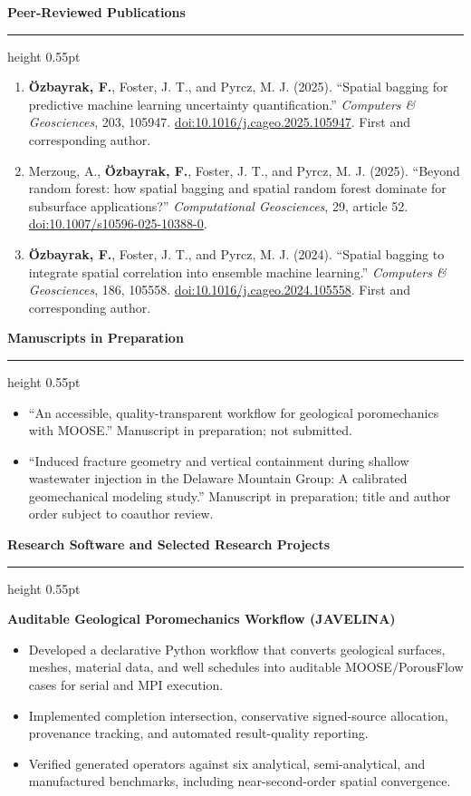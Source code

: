 \documentclass[10pt,letterpaper]{article}
\newcommand{\cvsection}[1]{%
  \needspace{4\baselineskip}%
  \vspace{5pt}%
  {\fontsize{11.5}{13.2}\selectfont\bfseries\color{accent} #1}\par
  \vspace{1.2pt}\color{accent}\hrule height 0.55pt\color{ink}\vspace{3pt}%
}
\newcommand{\cvproject}[2]{%
  \needspace{3\baselineskip}%
  {\bfseries #1}\hspace{0.35em}{\color{muted}#2}\par
  \vspace{0.5pt}%
}
\newenvironment{cvitems}{%
  \begin{itemize}[leftmargin=13pt,label=\textbullet,itemsep=1.2pt,topsep=1pt,parsep=0pt,partopsep=0pt]
}{\end{itemize}\vspace{1.5pt}}
\newenvironment{compactitems}{%
  \begin{itemize}[leftmargin=13pt,label=\textbullet,itemsep=0.8pt,topsep=1pt,parsep=0pt,partopsep=0pt]
}{\end{itemize}\vspace{1pt}}
\begin{document}
\newpage

\cvsection{Peer-Reviewed Publications}
\begin{enumerate}[leftmargin=18pt,label={\arabic*.},itemsep=3pt,topsep=1pt,parsep=0pt]
  \item \textbf{Özbayrak, F.}, Foster, J. T., and Pyrcz, M. J. (2025). ``Spatial bagging for predictive machine learning uncertainty quantification.'' \emph{Computers \& Geosciences}, 203, 105947. \href{https://doi.org/10.1016/j.cageo.2025.105947}{doi:10.1016/j.cageo.2025.105947}. First and corresponding author.
  \item Merzoug, A., \textbf{Özbayrak, F.}, Foster, J. T., and Pyrcz, M. J. (2025). ``Beyond random forest: how spatial bagging and spatial random forest dominate for subsurface applications?'' \emph{Computational Geosciences}, 29, article 52. \href{https://doi.org/10.1007/s10596-025-10388-0}{doi:10.1007/s10596-025-10388-0}.
  \item \textbf{Özbayrak, F.}, Foster, J. T., and Pyrcz, M. J. (2024). ``Spatial bagging to integrate spatial correlation into ensemble machine learning.'' \emph{Computers \& Geosciences}, 186, 105558. \href{https://doi.org/10.1016/j.cageo.2024.105558}{doi:10.1016/j.cageo.2024.105558}. First and corresponding author.
\end{enumerate}

\cvsection{Manuscripts in Preparation}
\begin{compactitems}
  \item ``An accessible, quality-transparent workflow for geological poromechanics with MOOSE.'' Manuscript in preparation; not submitted.
  \item ``Induced fracture geometry and vertical containment during shallow wastewater injection in the Delaware Mountain Group: A calibrated geomechanical modeling study.'' Manuscript in preparation; title and author order subject to coauthor review.
\end{compactitems}

\cvsection{Research Software and Selected Research Projects}
\cvproject{Auditable Geological Poromechanics Workflow (JAVELINA)}{2026}
\begin{cvitems}
  \item Developed a declarative Python workflow that converts geological surfaces, meshes, material data, and well schedules into auditable MOOSE/PorousFlow cases for serial and MPI execution.
  \item Implemented completion intersection, conservative signed-source allocation, provenance tracking, and automated result-quality reporting.
  \item Verified generated operators against six analytical, semi-analytical, and manufactured benchmarks, including near-second-order spatial convergence.
\end{cvitems}
\end{document}
